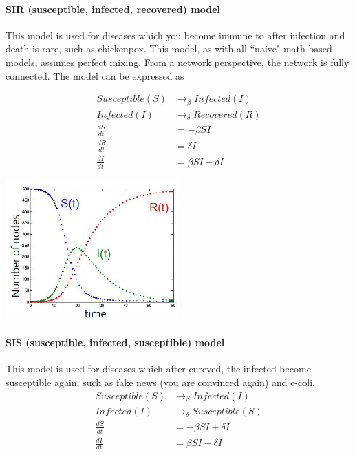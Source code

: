 \paragraph{SIR (susceptible, infected, recovered) model} This model is used for diseases which you become immune to after infection and death is rare, such as chickenpox. This model, as with all ``naive" math-based models, assumes perfect mixing. From a network perspective, the network is fully connected. The model can be expressed as 

\begin{align}
    Susceptible (S) &\rightarrow_{\beta} Infected (I) \\
    Infected (I) &\rightarrow_{\delta} Recovered (R) \\
    \frac{dS}{dt} &= -\beta SI \\
    \frac{dR}{dt} &= \delta I \\
    \frac{dI}{dt} &= \beta SI - \delta I
\end{align}{}

{
\centering
\includegraphics[width=0.5\textwidth]{notes/img/l13_p20_sir.JPG} \par
}

\paragraph{SIS (susceptible, infected, susceptible) model} This model is used for diseases which after cureved, the infected become susceptible again, such as fake news (you are convinced again) and e-coli. 
\begin{align}
    Susceptible (S) &\rightarrow_{\beta} Infected (I) \\
    Infected (I) &\rightarrow_{\delta} Susceptible (S) \\
    \frac{dS}{dt} &= -\beta SI + \delta I\\
    \frac{dI}{dt} &= \beta SI - \delta  I
\end{align}{}

